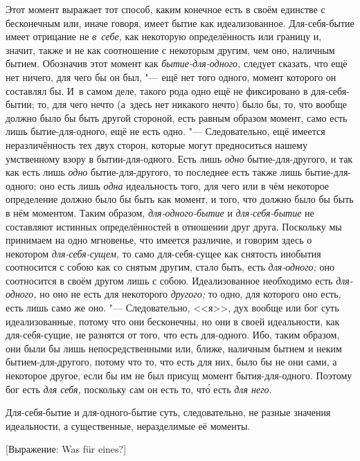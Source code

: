 Этот момент выражает тот способ, каким конечное есть в своём единстве с
бесконечным или, иначе говоря, имеет бытие как идеализованное.
Для-себя-бытие имеет отрицание не {\em в~себе,} как
некоторую определённость или границу и, значит, также и не как соотношение
с некоторым другим, чем оно, наличным бытием. Обозначив этот момент как
{\em бытие-для-одного,} следует сказать, что ещё нет
ничего, для чего бы он был, "--- ещё нет того одного, момент которого он
составлял бы. И~в самом деле, такого рода одно ещё не фиксировано в
для-себя-бытии; то, для чего нечто (а~здесь нет никакого нечто) было бы,
то, что вообще должно было бы быть другой стороной, есть равным образом
момент, само есть лишь бытие-для-одного, ещё не есть одно. "--- Следовательно,
ещё имеется неразличённость тех двух сторон, которые могут предноситься
нашему умственному взору в бытии-для-одного. Есть лишь
{\em одно} бытие-для-другого, и так как есть лишь
{\em одно} бытие-для-другого, то последнее есть также
лишь бытие-для-одного; оно есть лишь {\em одна}
идеальность того, для чего или в чём некоторое определение должно было бы
быть как момент, и того, что должно было бы быть в нём моментом. Таким
образом, {\em для-одного-бытие} и
{\em для-себя-бытие} не составляют истинных
определённостей в отношении друг друга. Поскольку мы принимаем на одно
мгновенье, что имеется различие, и говорим здесь о некотором
{\em для-себя-сущем,} то само для-себя-сущее как
снятость инобытия соотносится с собою как со снятым другим, стало быть,
есть {\em для-одного;} оно соотносится в своём другом
лишь с собою. Идеализованное необходимо есть
{\em для-одного,} но оно не есть для некоторого
{\em другого;} то одно, для которого оно есть, есть
лишь само же оно. "--- Следовательно, <<я>>, дух вообще или бог суть
идеализованные, потому что они бесконечны, но они в своей идеальности, как
для-себя-сущие, не разнятся от того, что есть для-одного. Ибо, таким
образом, они были бы лишь непосредственными или, ближе, наличным бытием и
неким бытием-для-другого, потому что то, что есть для них, было бы не они
сами, а некоторое другое, если бы им не был присущ момент бытия-для-одного.
Поэтому бог есть {\em для себя,} поскольку сам он есть
то, чт\'{о} есть {\em для него}.

Для-себя-бытие и для-одного-бытие суть, следовательно, не разные значения
идеальности, а существенные, неразделимые её моменты.

%
{[Выражение: Was für eines?]}

